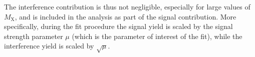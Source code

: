 The interference contribution is thus not negligible, especially for large values of $M_\mathrm{X}$, and is included in the analysis as part of the signal contribution. More specifically, during the fit procedure the signal yield is scaled by the signal strength parameter $\mu$ (which is the parameter of interest of the fit), while the interference yield is scaled by $\sqrt{\mu}$.


